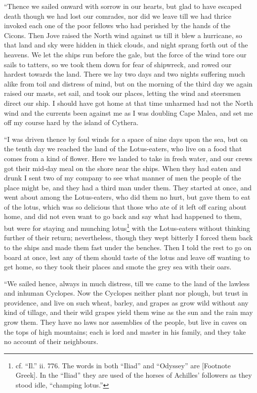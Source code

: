 “Thence we sailed onward with sorrow in our hearts, but glad to have escaped
death though we had lost our comrades, nor did we leave till we had thrice
invoked each one of the poor fellows who had perished by the hands of the
Cicons. Then Jove raised the North wind against us till it blew a hurricane, so
that land and sky were hidden in thick clouds, and night sprang forth out of
the heavens. We let the ships run before the gale, but the force of the wind
tore our sails to tatters, so we took them down for fear of shipwreck, and
rowed our hardest towards the land. There we lay two days and two nights
suffering much alike from toil and distress of mind, but on the morning of the
third day we again raised our masts, set sail, and took our places, letting the
wind and steersmen direct our ship. I should have got home at that time
unharmed had not the North wind and the currents been against me as I was
doubling Cape Malea, and set me off my course hard by the island of Cythera.

“I was driven thence by foul winds for a space of nine days upon the sea, but
on the tenth day we reached the land of the Lotus-eaters, who live on a food
that comes from a kind of flower. Here we landed to take in fresh water, and
our crews got their mid-day meal on the shore near the ships. When they had
eaten and drunk I sent two of my company to see what manner of men the people
of the place might be, and they had a third man under them. They started at
once, and went about among the Lotus-eaters, who did them no hurt, but gave
them to eat of the lotus, which was so delicious that those who ate of it left
off caring about home, and did not even want to go back and say what had
happened to them, but were for staying and munching lotus\footnote{cf. “Il.” ii. 776. The words in both “Iliad” and “Odyssey” are [Footnote
Greek]. In the “Iliad” they are used of the horses of Achilles’ followers as
they stood idle, “champing lotus.”} with the Lotus-eaters without
thinking further of their return; nevertheless, though they wept bitterly I
forced them back to the ships and made them fast under the benches. Then I told
the rest to go on board at once, lest any of them should taste of the lotus and
leave off wanting to get home, so they took their places and smote the grey sea
with their oars.

“We sailed hence, always in much distress, till we came to the land of the
lawless and inhuman Cyclopes. Now the Cyclopes neither plant nor plough, but
trust in providence, and live on such wheat, barley, and grapes as grow wild
without any kind of tillage, and their wild grapes yield them wine as the sun
and the rain may grow them. They have no laws nor assemblies of the people, but
live in caves on the tops of high mountains; each is lord and master in his
family, and they take no account of their neighbours.

